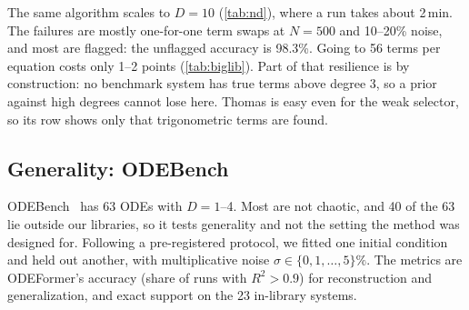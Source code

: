 \begin{table}[t]
\centering
\caption{Large libraries (frozen test subsets). Degree 4/5 and the mixed library reuse the sealed instances. The degree-3+trig rows on polynomial systems cover only 1\% and 10\% noise.}
\label{tab:biglib}
\small
{}
\end{table}

The same algorithm scales to $D=10$ (\cref{tab:nd}), where a run takes about 2\,min. The failures are mostly one-for-one term swaps at $N=500$ and 10--20\% noise, and most are flagged: the unflagged accuracy is 98.3\%. Going to 56 terms per equation costs only 1--2 points (\cref{tab:biglib}). Part of that resilience is by construction: no benchmark system has true terms above degree 3, so a prior against high degrees cannot lose here. Thomas is easy even for the weak selector, so its row shows only that trigonometric terms are found.

\subsection{Generality: ODEBench}
\label{sec:odebench}
ODEBench~\citep{dascoli2024odeformer} has 63 ODEs with $D=1$--4. Most are not chaotic, and 40 of the 63 lie outside our libraries, so it tests generality and not the setting the method was designed for. Following a pre-registered protocol, we fitted one initial condition and held out another, with multiplicative noise $\sigma\in\{0,1,\dots,5\}\%$. The metrics are ODEFormer's accuracy (share of runs with $R^2>0.9$) for reconstruction and generalization, and exact support on the 23 in-library systems.

